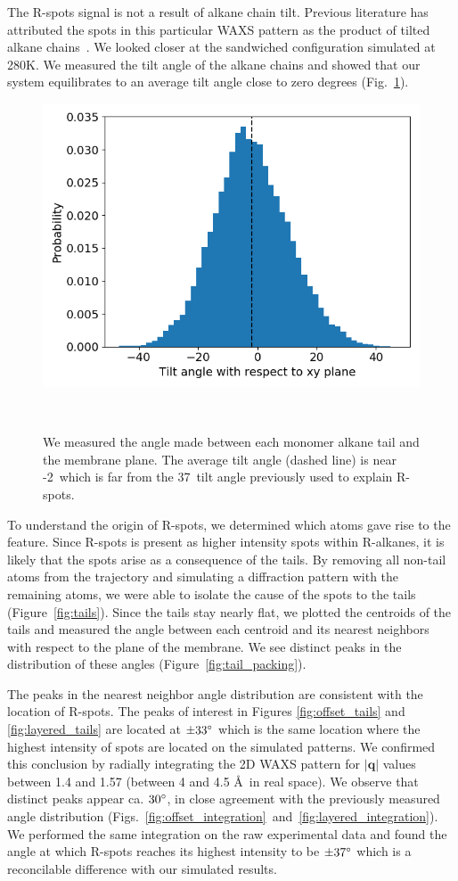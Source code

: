 \documentclass[journal=jpcbfk,manusciprt=article]{achemso}
\begin{document}
  The R-spots signal is not a result of alkane chain tilt. Previous literature
  has attributed the spots in this particular WAXS pattern as the product of tilted alkane
  chains~\cite{feng_scalable_2014}. We looked closer at the sandwiched
  configuration simulated at 280K. We measured the tilt angle of the alkane chains and 
  showed that our system equilibrates to an average tilt angle close to zero degrees
  (Fig.~\ref{fig:tilt}). 
  
  \begin{figure}
  \centering
  \includegraphics[width=0.5\linewidth]{tilt_dist.png}
  \caption{We measured the angle made between each monomer alkane tail and the
	  membrane plane. The average tilt angle (dashed line) is near -2\degree~which is far from 
	  the 37\degree~tilt angle previously used to explain R-spots.}~\label{fig:tilt}
  \end{figure}

  To understand the origin of R-spots, we determined which
  atoms gave rise to the feature. Since R-spots is present as higher intensity
  spots within R-alkanes, it is likely that the spots arise as a consequence of
  the tails. By removing all non-tail atoms from the trajectory and simulating a
  diffraction pattern with the remaining atoms, we were able to isolate the cause of 
  the spots to the tails (Figure~\ref{fig:tails}). Since the tails stay nearly flat, we plotted
  the centroids of the tails and measured the angle between each centroid and its
  nearest neighbors with respect to the plane of the membrane. We see distinct
  peaks in the distribution of these angles (Figure~\ref{fig:tail_packing}).

  The peaks in the nearest neighbor angle distribution are consistent with the
  location of R-spots. The peaks of interest in Figures \ref{fig:offset_tails}
  and \ref{fig:layered_tails} are located at $\pm 33 \degree$ which is the same
  location where the highest intensity of spots are located on the simulated
  patterns. We confirmed this conclusion by radially integrating the 2D WAXS
  pattern for $\left|\mathbf{q}\right|$ values between 1.4 and 1.57 (between 4
  and 4.5 \AA~in real space). We observe that distinct peaks appear ca. $30
  \degree$, in close agreement with the previously measured angle distribution
  (Figs.~\ref{fig:offset_integration}~and~\ref{fig:layered_integration}). We
  performed the same integration on the raw experimental data and found the angle
  at which R-spots reaches its highest intensity to be $\pm 37 \degree$ which
  is a reconcilable difference with our simulated results.
\end{document}
